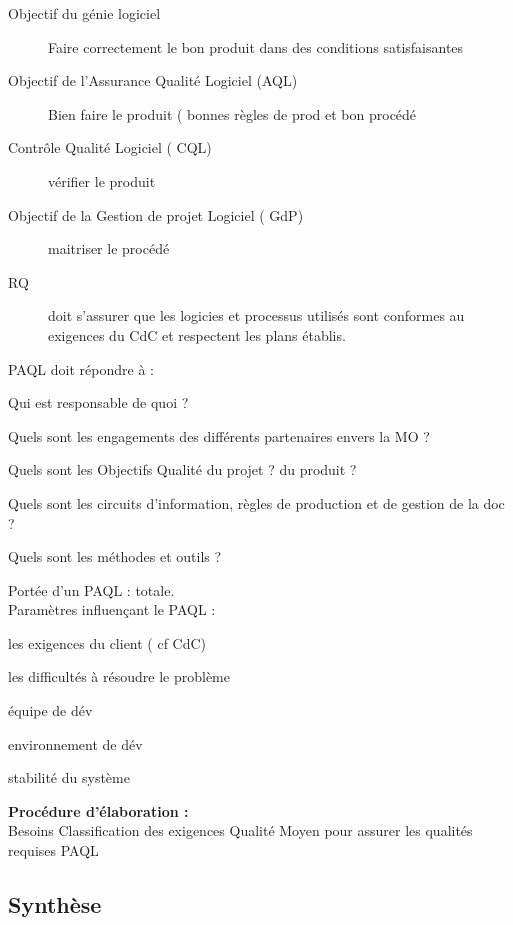 	\begin{description}
	\item[Objectif du génie logiciel] Faire correctement le bon produit dans des conditions satisfaisantes
	\item[Objectif de l’Assurance Qualité Logiciel (AQL)] Bien faire le produit ( bonnes règles de prod et bon procédé
	\item[Contrôle Qualité Logiciel ( CQL)] vérifier le produit
	\item[Objectif de la Gestion de projet Logiciel ( GdP)] maitriser le procédé

	\item[RQ] doit s’assurer que les logicies et processus utilisés sont conformes au exigences du CdC et respectent les plans établis.
	\end{description}

	PAQL doit répondre à :
	\begin{description}
	\item Qui est responsable de quoi ?
	\item Quels sont les engagements des différents partenaires envers la MO ?
	\item Quels sont les Objectifs Qualité du projet ? du produit ?
	\item Quels sont les circuits d’information, règles de production et de gestion de la doc ?
	\item Quels sont les méthodes et outils ?
	\end{description}

Portée d’un PAQL : totale.\\

Paramètres influençant le PAQL :
	\begin{description}
	\item les exigences du client ( cf CdC)
	\item les difficultés à résoudre le problème
	\item équipe de dév
	\item environnement de dév
	\item stabilité du système
	\end{description}

\textbf{Procédure d’élaboration :}\hfill\\
	Besoins \rightarrow Classification des exigences Qualité \rightarrow Moyen pour assurer les qualités requises \rightarrow PAQL

	\subsection{Synthèse}
	
